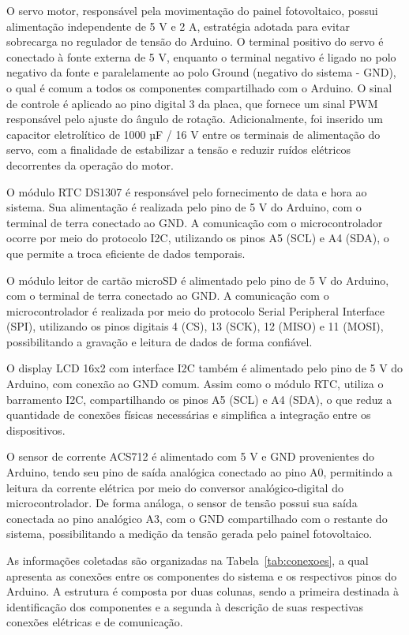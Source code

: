 O servo motor, responsável pela movimentação do painel fotovoltaico, possui alimentação independente de 5 V e 2 A, estratégia adotada para evitar sobrecarga no regulador de tensão do Arduino. O terminal positivo do servo é conectado à fonte externa de 5 V, enquanto o terminal negativo é ligado no polo negativo da fonte e paralelamente ao polo Ground (negativo do sistema - GND), o qual é comum a todos os componentes compartilhado com o Arduino. O sinal de controle é aplicado ao pino digital 3 da placa, que fornece um sinal PWM responsável pelo ajuste do ângulo de rotação. Adicionalmente, foi inserido um capacitor eletrolítico de 1000 µF / 16 V entre os terminais de alimentação do servo, com a finalidade de estabilizar a tensão e reduzir ruídos elétricos decorrentes da operação do motor.

O módulo RTC DS1307 é responsável pelo fornecimento de data e hora ao sistema. Sua alimentação é realizada pelo pino de 5 V do Arduino, com o terminal de terra conectado ao GND. A comunicação com o microcontrolador ocorre por meio do protocolo I2C, utilizando os pinos A5 (SCL) e A4 (SDA), o que permite a troca eficiente de dados temporais.

O módulo leitor de cartão microSD é alimentado pelo pino de 5 V do Arduino, com o terminal de terra conectado ao GND. A comunicação com o microcontrolador é realizada por meio do protocolo Serial Peripheral Interface (SPI), utilizando os pinos digitais 4 (CS), 13 (SCK), 12 (MISO) e 11 (MOSI), possibilitando a gravação e leitura de dados de forma confiável.

O display LCD 16x2 com interface I2C também é alimentado pelo pino de 5 V do Arduino, com conexão ao GND comum. Assim como o módulo RTC, utiliza o barramento I2C, compartilhando os pinos A5 (SCL) e A4 (SDA), o que reduz a quantidade de conexões físicas necessárias e simplifica a integração entre os dispositivos.

O sensor de corrente ACS712 é alimentado com 5 V e GND provenientes do Arduino, tendo seu pino de saída analógica conectado ao pino A0, permitindo a leitura da corrente elétrica por meio do conversor analógico-digital do microcontrolador. De forma análoga, o sensor de tensão possui sua saída conectada ao pino analógico A3, com o GND compartilhado com o restante do sistema, possibilitando a medição da tensão gerada pelo painel fotovoltaico.

As informações coletadas são organizadas na Tabela~\ref{tab:conexoes}, a qual apresenta as conexões entre os componentes do sistema e os respectivos pinos do Arduino. A estrutura é composta por duas colunas, sendo a primeira destinada à identificação dos componentes e a segunda à descrição de suas respectivas conexões elétricas e de comunicação.

